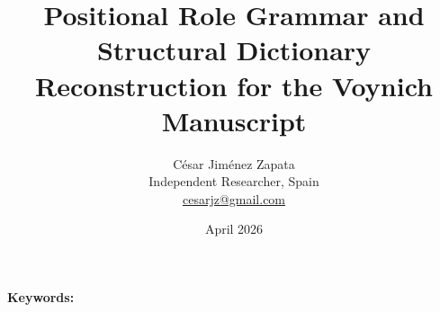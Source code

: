 \documentclass[11pt,a4paper]{article}
\newcommand{\vms}{Voynich Manuscript}
\begin{document}
\title{Positional Role Grammar and Structural Dictionary\\
Reconstruction for the \vms}

\author{C\'esar Jim\'enez Zapata\\
\small Independent Researcher, Spain\\
\small \href{mailto:cesarjz@gmail.com}{cesarjz@gmail.com}}

\date{April 2026}

\maketitle

\begin{abstract}

\end{abstract}

\noindent\textbf{Keywords:} 





\end{document}
